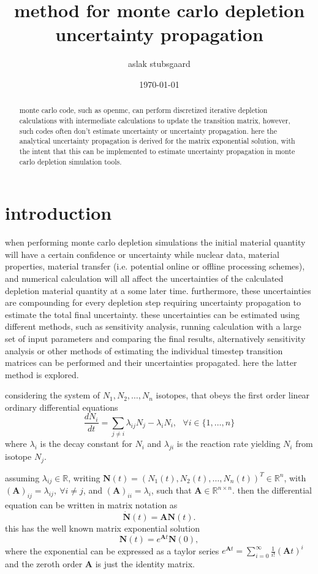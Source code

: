 \documentclass[a4paper]{article}
\title{method for monte carlo depletion uncertainty propagation}
\author{aslak stubsgaard}
\date{\today}
\begin{document}
\maketitle

\begin{abstract}
	\noindent
	monte carlo code, such as openmc, can perform discretized iterative depletion calculations with intermediate calculations to update the transition matrix, however, such codes often don't estimate uncertainty or uncertainty propagation. here the analytical uncertainty propagation is derived for the matrix exponential solution, with the intent that this can be implemented to estimate uncertainty propagation in monte carlo depletion simulation tools.
\end{abstract}


\section*{introduction}
when performing monte carlo depletion simulations the initial material quantity will have a certain confidence or uncertainty while nuclear data, material properties, material transfer (i.e. potential online or offline processing schemes), and numerical calculation will all affect the uncertainties of the calculated depletion material quantity at a some later time.
furthermore, these uncertainties are compounding for every depletion step requiring uncertainty propagation to estimate the total final uncertainty. these uncertainties can be estimated using different methods, such as sensitivity analysis, running calculation with a large set of input parameters and comparing the final results, alternatively sensitivity analysis or other methods of estimating the individual timestep transition matrices can be performed and their uncertainties propagated. here the latter method is explored.

considering the system of $N_1,N_2,\ldots,N_n$ isotopes, that obeys the first order linear ordinary differential equations
\begin{equation}
\frac{dN_i}{dt}=\sum_{j\neq i} \lambda_{ij}N_j -\lambda_i N_i,~~~\forall i\in\{1,\ldots,n\}
\end{equation}
where $\lambda_i$ is the decay constant for $N_i$ and $\lambda_{ji}$ is the reaction rate yielding $N_i$ from isotope $N_j$.

assuming $\lambda_{ij}\in \mathbb{R}$, writing $\bm{N}(t)=(N_1(t),N_2(t),\ldots,N_n(t))^T\in\mathbb{R}^n$, with $\left(\bm{A}\right)_{ij}=\lambda_{ij},~\forall i\neq j$, and $\left(\bm{A}\right)_{ii}=\lambda_{i}$, such that $\bm{A}\in\mathbb{R}^{n\times n}$.
then the differential equation can be written in matrix notation as
\begin{equation}
\dot{\bm{N}}(t)=\bm{A}\bm{N}(t).
\end{equation}
this has the well known matrix exponential solution
\begin{equation}
\bm{N}(t)=e^{\bm{A}t}\bm{N}(0),
\end{equation}
where the exponential can be expressed as a taylor series $e^{\bm{A}t}=\sum_{i=0}^\infty \frac{1}{i!}(\bm{A}t)^i$ and the zeroth order $\bm{A}$ is just the identity matrix.
\end{document}
